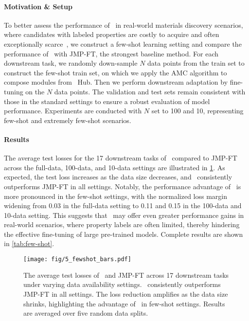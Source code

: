\paragraph{Motivation \& Setup}
To better assess the performance of \name \ in real-world materials discovery scenarios, where candidates with labeled properties are costly to acquire and often exceptionally scarce~\cite{abed2024open}, we construct a few-shot learning setting and compare the performance of \name \ with JMP-FT, the strongest baseline method. For each downstream task, we randomly down-sample $N$ data points from the train set to construct the few-shot train set, on which we apply the AMC algorithm to compose modules from \name \ Hub. Then we perform downstream adaptation by fine-tuning on the $N$ data points. The validation and test sets remain consistent with those in the standard settings to ensure a robust evaluation of model performance. Experiments are conducted with $N$ set to 100 and 10, representing few-shot and extremely few-shot scenarios.

\paragraph{Results}
The average test losses for the 17 downstream tasks of \name \ compared to JMP-FT across the full-data, 100-data, and 10-data settings are illustrated in \cref{fig:delta}.
As expected, the test loss increases as the data size decreases, and \name \ consistently outperforms JMP-FT in all settings.
Notably, the performance advantage of \name \ is more pronounced in the few-shot settings, with the normalized loss margin widening from 0.03 in the full-data setting to 0.11 and 0.15 in the 100-data and 10-data setting.
This suggests that \name \ may offer even greater performance gains in real-world scenarios, where property labels are often limited, thereby hindering the effective fine-tuning of large pre-trained models.
Complete results are shown in \cref{tab:few-shot}.

\begin{figure}[!th]
    \centering
    \texttt{[image: fig/5\_fewshot\_bars.pdf]}
    
    \caption{The average test losses of \name \ and JMP-FT across 17 downstream tasks under varying data availability settings.
    \name \ consistently outperforms JMP-FT in all settings. The loss reduction amplifies as the data size shrinks, highlighting the advantage of \name \ in few-shot settings.
    Results are averaged over five random data splits.}
    \label{fig:delta}
\end{figure}


